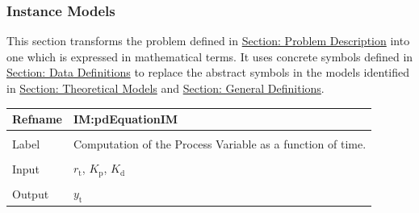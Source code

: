 \documentclass[12pt]{article}
\begin{document}
\subsubsection{Instance Models}
\label{Sec:IMs}
This section transforms the problem defined in \hyperref[Sec:ProbDesc]{Section: Problem Description} into one which is expressed in mathematical terms. It uses concrete symbols defined in \hyperref[Sec:DDs]{Section: Data Definitions} to replace the abstract symbols in the models identified in \hyperref[Sec:TMs]{Section: Theoretical Models} and \hyperref[Sec:GDs]{Section: General Definitions}.

\vspace{\baselineskip}
\noindent
\begin{minipage}{\textwidth}
\begin{tabular}{>{\raggedright}p{}>{\raggedright\arraybackslash}p{}}
\toprule \textbf{Refname} & \textbf{IM:pdEquationIM}
\label{IM:pdEquationIM}
\\ \midrule \\
Label & Computation of the Process Variable as a function of time.
        
\\ \midrule \\
Input & ${r_{\text{t}}}$, ${K_{\text{p}}}$, ${K_{\text{d}}}$
        
\\ \midrule \\
Output & ${y_{\text{t}}}$
         

\end{tabular}
\end{minipage}
\end{document}
